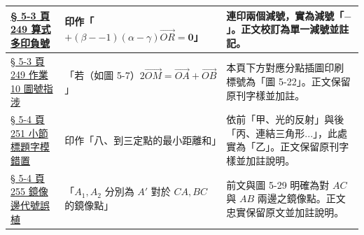 \documentclass[a4paper,12pt,twoside]{article}
\begin{document}
\begin{table}[H]
\begin{tabularx}{\textwidth}{|p{3.2cm}|p{3.8cm}|X|}
\hyperref[note:b3s-ch5-p249-double-minus]{§ 5-3 頁 249 算式多印負號} & 
印作「$+(\beta--1)(\alpha-\gamma)\vec{OR} = \mathbf{0}$」 & 
連印兩個減號，實為減號「$-$」。正文校訂為單一減號並註記。 \\ \hline

\hyperref[note:b3s-ch5-p249-fig-ref]{§ 5-3 頁 249 作業 10 圖號指涉} & 
「若（如圖 5-7）$2\vec{OM} = \vec{OA} + \vec{OB}$」 & 
本頁下方對應分點插圖印刷標號為「圖 5-22」。正文保留原刊字樣並加註。 \\ \hline

\hyperref[note:b3s-ch5-p251-sec-title]{§ 5-4 頁 251 小節標題字模錯置} & 
印作「八、到三定點的最小距離和」 & 
依前「甲、光的反射」與後「丙、連結三角形...」，此處實為「乙」。正文保留原刊字樣並加註說明。 \\ \hline

\hyperref[note:b3s-ch5-p255-mirror-line]{§ 5-4 頁 255 鏡像邊代號誤植} & 
「$A_1, A_2$ 分別為 $A'$ 對於 $CA, BC$ 的鏡像點」 & 
前文與圖 5-29 明確為對 $AC$ 與 $AB$ 兩邊之鏡像點。正文忠實保留原文並加註說明。 \\ \hline

\end{tabularx}
\end{table}
\end{document}
